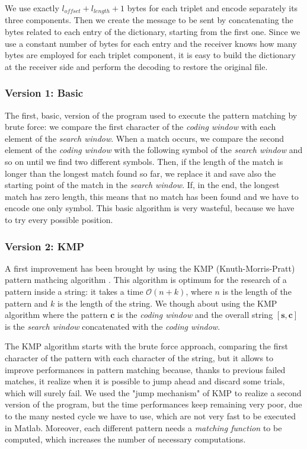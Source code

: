 We use exactly $l_{offset} + l_{length} + 1$ bytes for each triplet and encode separately its three components. Then we create the message to be sent by concatenating the bytes related to each entry of the dictionary, starting from the first one. Since we use a constant number of bytes for each entry and the receiver knows how many bytes are employed for each triplet component, it is easy to build the dictionary at the receiver side and perform the decoding to restore the original file.

\subsubsection{Version 1: Basic}
The first, basic, version of the program used to execute the pattern matching by brute force: we compare the first character of the \textit{coding window} with each element of the \textit{search window}. When a match occurs, we compare the second element of the \textit{coding window} with the following symbol of the \textit{search window} and so on until we find two different symbols. Then, if the length of the match is longer than the longest match found so far, we replace it and save also the starting point of the match in the \textit{search window}. If, in the end, the longest match has zero length, this means that no match has been found and we have to encode one only symbol. This basic algorithm is very wasteful, because we have to try every possible position.

\subsubsection{Version 2: KMP}
A first improvement has been brought by using the KMP (Knuth-Morris-Pratt) pattern mathcing algorithm \cite{knuth1}. This algorithm is optimum for the research of a pattern inside a string: it takes a time $\mathcal{O}(n + k)$, where $n$ is the length of the pattern and $k$ is the length of the string. We though about using the KMP algorithm where the pattern $\mathbf{c}$ is the \textit{coding window} and the overall string $[\mathbf{s}, \mathbf{c}]$ is the \textit{search window} concatenated with the \textit{coding window}.

The KMP algorithm starts with the brute force approach, comparing the first character of the pattern with each character of the string, but it allows to improve performances in pattern matching because, thanks to previous failed matches, it realize when it is possible to jump ahead and discard some trials, which will surely fail. We used the "jump mechanism" of KMP to realize a second version of the program, but the time performances keep remaining very poor, due to the many nested cycle we have to use, which are not very fast to be executed in Matlab. Moreover, each different pattern needs a \textit{matching function} to be computed, which increases the number of necessary computations.


